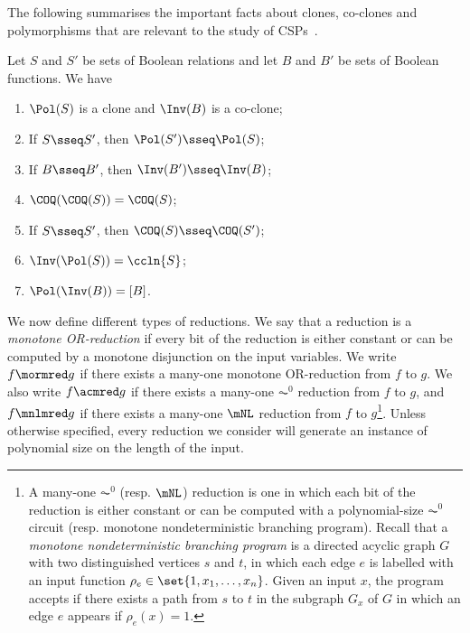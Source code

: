 \documentclass[11pt]{article}
\begin{document}
The following summarises the important facts about
clones, co-clones and polymorphisms that are relevant to
the study of CSPs~\cite{10.1145/263867.263489}. 

\begin{lemma}
    \label{lem:galois}
    Let 
    $S$ 
    and $S'$
    be sets
    of Boolean relations 
    and
    let
    $B$ 
    and $B'$
    be sets
    of Boolean functions.
    We have
    \begin{enumerate}[label=(\roman*)]
        \item 
            \label{item:pol-clone}
            $\Pol(S)$ is a clone and $\Inv(B)$ is a co-clone;
        \item 
            \label{item:pol-invert}
            If 
            $S \sseq S'$,
            then
            $\Pol(S') \sseq \Pol(S)$;
        \item 
            \label{item:inv-invert}
            If 
            $B \sseq B'$,
            then
            $\Inv(B') \sseq \Inv(B)$;
        \item 
            \label{item:coq-idempotent}
            $\COQ(\COQ(S)) = \COQ(S)$;
        \item 
            \label{item:coq-sseq}
            If $S \sseq S'$, then
            $\COQ(S) \sseq \COQ(S')$;
        \item 
            \label{item:invpol}
            $\Inv(\Pol(S)) = \ccln{S}$;
        \item 
            \label{item:polinv}
            $\Pol(\Inv(B)) = [B]$.
    \end{enumerate}
\end{lemma}

We now define 
different
types of reductions.
We say that a reduction is a \emph{monotone OR-reduction}
if
every bit of the reduction is either constant
or can be computed by a monotone disjunction on the
input variables.
We write $f \mormred g$ if 
there exists a many-one monotone OR-reduction
from $f$ to $g$.
We also write 
$f \acmred g$
if 
there exists a many-one
$\AC^0$ reduction
from $f$ to $g$,
and
$f \mnlmred g$
if 
there exists a many-one
$\mNL$ reduction
from $f$ to $g$\footnote{A many-one $\AC^0$ (resp. $\mNL$) reduction is one
in which each bit of the reduction is either constant or 
can be computed with a polynomial-size $\AC^0$ circuit
(resp. monotone nondeterministic branching program). 
Recall that a 
\emph{monotone nondeterministic branching program} 
is a directed acyclic graph $G$ with two
distinguished vertices $s$ and $t$, 
in which each edge $e$ is labelled with an input function 
$\rho_e \in \set{1,x_1,\dots,x_n}$. 
Given an input $x$, the program accepts if there
exists a path from $s$ to $t$ in the subgraph $G_x$ of $G$ 
in which an edge $e$ appears if $\rho_e(x)=1$.
}.
Unless otherwise specified, every reduction we consider will generate an instance
of polynomial size on the length of the input.
\end{document}
